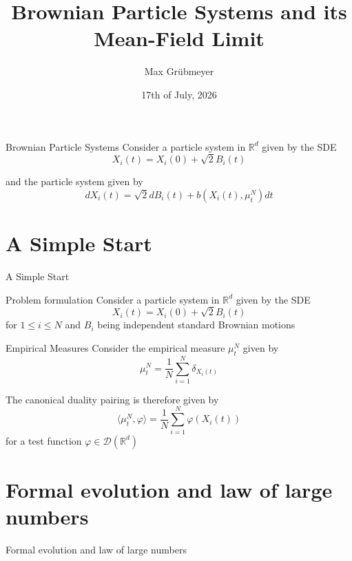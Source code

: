 \documentclass{beamer}
\title[]{Brownian Particle Systems and its\\Mean-Field Limit}
\author{Max Grübmeyer}
\date{17th of July, 2026}
\newcommand{\sectionstart}[1]{
    \section{#1}
    \begin{frame}
        \centering
        \huge{#1}
    \end{frame}
}
\newcommand{\R}{\mathbb{R}}
\begin{document}
    \begin{frame}
        \titlepage
    \end{frame}

    \begin{frame}{Brownian Particle Systems}
        Consider a particle system in $\R^d$ given by the SDE
        \begin{equation*}
            X_i(t) = X_i(0) + \sqrt2B_i(t)
        \end{equation*}

        \pause
        
        and the particle system given by
        \begin{equation*}
            dX_i(t) = \sqrt2dB_i(t) + b(X_i(t),\mu_t^N)dt
        \end{equation*}
    \end{frame}

    \sectionstart{A Simple Start}

    \begin{frame}{Problem formulation}
        Consider a particle system in $\R^d$ given by the SDE
        \begin{equation*}
            X_i(t) = X_i(0) + \sqrt2B_i(t)
        \end{equation*}
        for $1\leq i\leq N$ and $B_i$ being independent standard Brownian motions
    \end{frame}

    \begin{frame}{Empirical Measures}
        Consider the empirical measure $\mu_t^N$ given by
        \begin{equation*}
            \mu_t^N = \frac{1}{N}\sum_{i=1}^N\delta_{X_i(t)}
        \end{equation*}

        \pause

        The canonical duality pairing is therefore given by
        \begin{equation*}
            \langle\mu_t^N,\varphi\rangle = \frac{1}{N}\sum_{i=1}^N\varphi(X_i(t))
        \end{equation*}
        for a test function $\varphi\in\mathcal{D}(\R^d)$
    \end{frame}

    \sectionstart{Formal evolution and law of large numbers}
\end{document}
